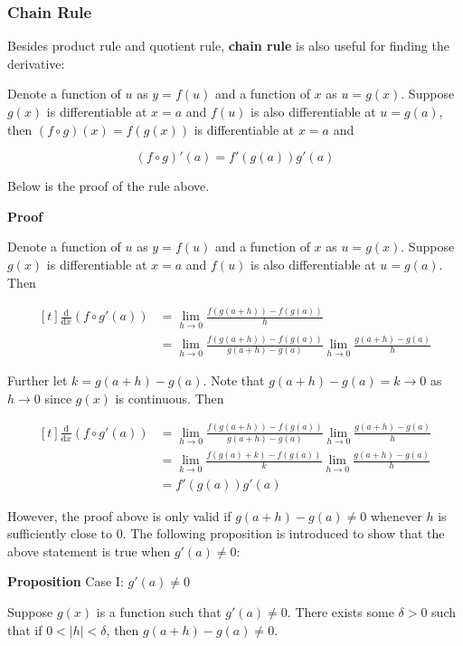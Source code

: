 \documentclass[a4paper,12pt]{article}
\newcommand{\s}{\vspace{1mm}}
\newcommand{\n}{\vspace{3mm}}
\newcommand{\diff}{\mathrm{d}}
\newenvironment{block}[4][Block]{ %
\begin{list}{}{
  \setlength{\leftmargin}{0mm}
  \setlength{\rightmargin}{0mm}
  \setlength{\topsep}{0mm}
  \setlength{\partopsep}{0mm}
  \parsep\parskip
  \setlength{\itemsep}{-\parsep}
  }
  \needspace{\baselineskip}
  \item \textbf{#2 #3} \hspace{1mm} #4
  \vspace{1mm}
  \item
  }
{
\end{list}
}
\begin{document}
\subsubsection{Chain Rule}
Besides product rule and quotient rule, \textbf{chain rule} is also useful for finding the derivative:\n

Denote a function of $u$ as $y=f(u)$ and a function of $x$ as $u=g(x)$. Suppose $g(x)$ is differentiable at $x=a$ and $f(u)$ is also differentiable at $u=g(a)$, then $(f\circ g)(x)=f(g(x))$ is differentiable at $x=a$ and

$$(f\circ g)'(a)=f'(g(a))g'(a)$$\s

Below is the proof of the rule above.\n

\begin{block}{Proof}{}{}
  Denote a function of $u$ as $y=f(u)$ and a function of $x$ as $u=g(x)$. Suppose $g(x)$ is differentiable at $x=a$ and $f(u)$ is also differentiable at $u=g(a)$. Then

  $$\begin{aligned}[t]
    \frac{\diff }{\diff  x}(f\circ g'(a))&=\lim_{h\to 0}\frac{f(g(a+h))-f(g(a))}{h}\\
    &=\lim_{h\to 0}\frac{f(g(a+h))-f(g(a))}{g(a+h)-g(a)}\lim_{h\to 0}\frac{g(a+h)-g(a)}{h}
  \end{aligned}$$\s

  Further let $k=g(a+h)-g(a)$. Note that $g(a+h)-g(a)=k\to 0$ as $h\to 0$ since $g(x)$ is continuous. Then

  $$\begin{aligned}[t]
    \frac{\diff }{\diff  x}(f\circ g'(a))&=\lim_{h\to 0}\frac{f(g(a+h))-f(g(a))}{g(a+h)-g(a)}\lim_{h\to 0}\frac{g(a+h)-g(a)}{h}\\
    &=\lim_{k\to 0}\frac{f(g(a)+k)-f(g(a))}{k}\lim_{h\to 0}\frac{g(a+h)-g(a)}{h}\\
    &=f'(g(a))g'(a)
  \end{aligned}$$
\end{block}\n

However, the proof above is only valid if $g(a+h)-g(a)\neq 0$ whenever $h$ is sufficiently close to $0$. The following proposition is introduced to show that the above statement is true when $g'(a)\neq 0$:\n

\begin{block}{Proposition}{}{Case I: $g'(a)\neq 0$}
  Suppose $g(x)$ is a function such that $g'(a)\neq 0$. There exists some $\delta>0$ such that if $0<\left| h\right| <\delta$, then $g(a+h)-g(a)\neq 0$.
\end{block}\n
\end{document}
